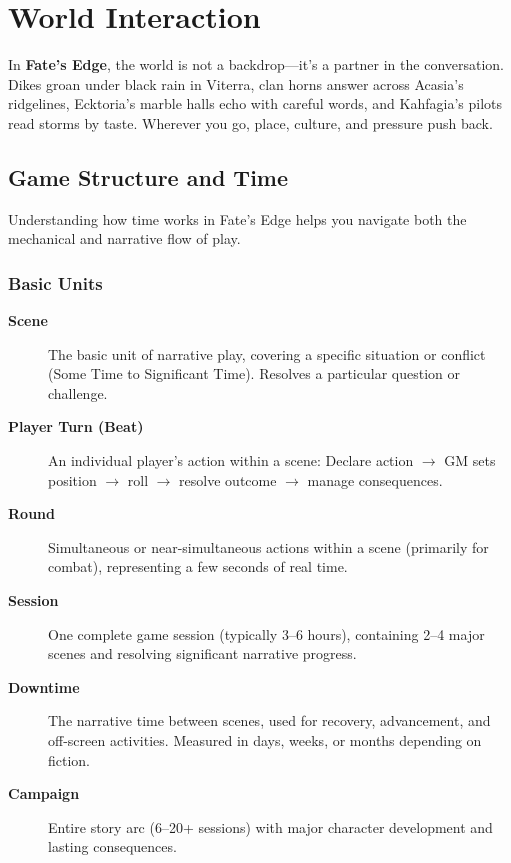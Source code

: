 \chapter{World Interaction}
\label{ch:world-interaction}

In \textbf{Fate's Edge}, the world is not a backdrop—it's a partner in the conversation. Dikes groan under black rain in Viterra, clan horns answer across Acasia's ridgelines, Ecktoria's marble halls echo with careful words, and Kahfagia's pilots read storms by taste. Wherever you go, place, culture, and pressure push back.

\section{Game Structure and Time}

Understanding how time works in Fate's Edge helps you navigate both the mechanical and narrative flow of play.

\subsection*{Basic Units}
\begin{description}
\item[\textbf{Scene}]  The basic unit of narrative play, covering a specific situation or conflict (Some Time to Significant Time). Resolves a particular question or challenge.
\item[\textbf{Player Turn (Beat)}]  An individual player's action within a scene: Declare action $\rightarrow$ GM sets position $\rightarrow$ roll $\rightarrow$ resolve outcome $\rightarrow$ manage consequences.
\item[\textbf{Round}]  Simultaneous or near-simultaneous actions within a scene (primarily for combat), representing a few seconds of real time.
\item[\textbf{Session}]  One complete game session (typically 3–6 hours), containing 2–4 major scenes and resolving significant narrative progress.
\item[\textbf{Downtime}]  The narrative time between scenes, used for recovery, advancement, and off-screen activities. Measured in days, weeks, or months depending on fiction.
\item[\textbf{Campaign}]  Entire story arc (6–20+ sessions) with major character development and lasting consequences.
\end{description}

